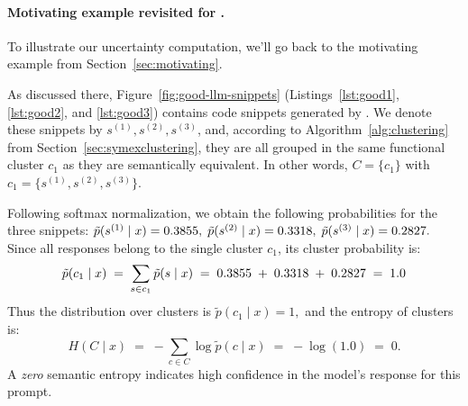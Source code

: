 \paragraph{Motivating example revisited for \textnormal{\gptturbo}.} To illustrate our uncertainty computation, we'll go back to the motivating example from Section~\ref{sec:motivating}.

As discussed there, Figure~\ref{fig:good-llm-snippets} (Listings~\ref{lst:good1}, \ref{lst:good2}, and \ref{lst:good3}) contains code snippets generated by \gptturbo. %
We denote these snippets by $s^{(1)}, s^{(2)}, s^{(3)}$, and, according to Algorithm~\ref{alg:clustering} from Section~\ref{sec:symexclustering}, they are all grouped in the same functional cluster $c_1$ as they are semantically equivalent.
In other words, $C = \{ c_1 \}$ with $c_1 = \{ s^{(1)}, s^{(2)}, s^{(3)} \}$.

Following softmax normalization, we obtain the following probabilities for the three snippets: %
\(\tilde{p}(s^{(1)} \mid x) = \SI{0.3855}{},\; \tilde{p}(s^{(2)} \mid x) = \SI{0.3318}{},\;
\tilde{p}(s^{(3)} \mid x) = \SI{0.2827}{}.\)
Since all responses belong to the single cluster $c_1$, its cluster probability is:
\[
   \tilde{p}(c_1 \mid x)
   \;=\;
   \sum_{s \in c_1} \tilde{p}(s \mid x)
   \;=\;
   \SI{0.3855}{} \;+\; \SI{0.3318}{} \;+\; \SI{0.2827}{}
   \;=\;
   1.0
\]
Thus the distribution over clusters is \(\tilde{p}(c_1 \mid x) = 1,\) and the entropy of clusters is:
\[
   H(C \mid x)
   \;=\;
   -\sum_{c \in C} \log \tilde{p}(c \mid x)
   \;=\;
   -\log(1.0)
   \;=\;
   0.
\]
A \emph{zero} semantic entropy indicates high confidence in the model's response for this prompt.


